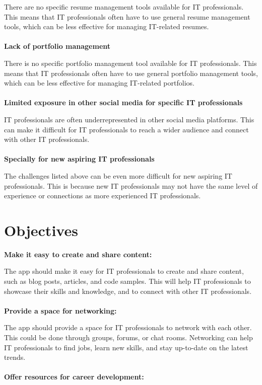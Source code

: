 \documentclass{article}
\begin{document}
There are no specific resume management tools available for IT professionals. This means that IT professionals often have to use general resume management tools, which can be less effective for managing IT-related resumes.\\\\
\textbf{Lack of portfolio management}


There is no specific portfolio management tool available for IT professionals. This means that IT professionals often have to use general portfolio management tools, which can be less effective for managing IT-related portfolios.\\\\
\textbf{Limited exposure in other social media for specific IT professionals}


IT professionals are often underrepresented in other social media platforms. This can make it difficult for IT professionals to reach a wider audience and connect with other IT professionals.\\\\
\textbf{Specially for new aspiring IT professionals}


The challenges listed above can be even more difficult for new aspiring IT professionals. This is because new IT professionals may not have the same level of experience or connections as more experienced IT professionals.\\

\section{Objectives}
\textbf{Make it easy to create and share content:}


The app should make it easy for IT professionals to create and share content, such as blog posts, articles, and code samples. This will help IT professionals to showcase their skills and knowledge, and to connect with other IT professionals.\\\\
\textbf{Provide a space for networking:}


The app should provide a space for IT professionals to network with each other. This could be done through groups, forums, or chat rooms. Networking can help IT professionals to find jobs, learn new skills, and stay up-to-date on the latest trends.\\\\
\textbf{Offer resources for career development:}
\end{document}
